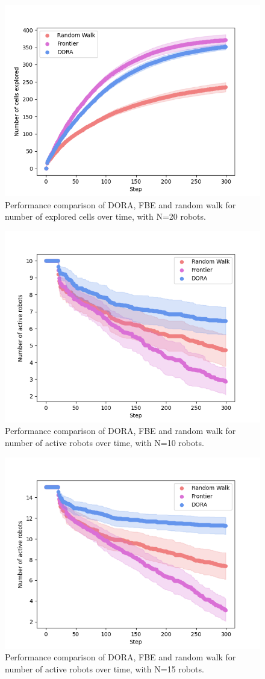 \begin{figure}[htbp]
	\centering
    \includegraphics[width=0.53\columnwidth]{images/explored_20.png}
    \caption{Performance comparison of DORA, FBE and random walk for number of explored cells over time, with N=20 robots.}
    \label{results:explored20}
\end{figure}

\begin{figure}[htbp]
	\centering
    \includegraphics[width=0.53\columnwidth]{images/activerobots_10.png}
    \caption{Performance comparison of DORA, FBE and random walk for number of active robots over time, with N=10 robots.}
    \label{results:failures10}
\end{figure}

\begin{figure}[htbp]
	\centering
    \includegraphics[width=0.53\columnwidth]{images/activerobots_15.png}
    \caption{Performance comparison of DORA, FBE and random walk for number of active robots over time, with N=15 robots.}
    \label{results:failures15}
\end{figure}

